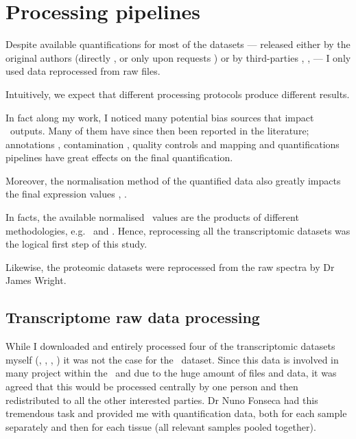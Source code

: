 \section{Processing pipelines}

Despite available quantifications for most of the datasets ---
released either by the original authors (directly \citep{Krupp2012},
\citep{Uhlen2015} or  only upon requests \citep{PandeyData})
or by third-parties \citep{BioGPS1}, \citep{EBIgxa},
\citep{Harmonizome} --- I only used data reprocessed from raw files.

Intuitively, we expect that different processing protocols produce
different results.

In fact along my work, I noticed many potential bias sources that impact
\Rnaseq\ outputs. Many of them have since then been reported in the literature;
annotations \citep{annotationDiff},
contamination \citep{contaminationRNAseq},
quality controls \citep{qualityRNAseq} and
mapping and quantifications pipelines \citep{Fonseca2014}
have great effects on the final quantification.

Moreover, the normalisation method of the quantified data also
greatly impacts the final expression values
\citep{Dillies2013}, \citep{normalisation2}.

In facts, the available normalised \Rnaseq\ values are the products
of different methodologies, e.g.\ \citep{GTExTranscript} and \citep{Krupp2012}.
Hence, reprocessing all the transcriptomic datasets was the logical
first step of this study.

Likewise, the proteomic datasets were reprocessed from the raw spectra by Dr
James Wright.


\subsection{Transcriptome raw data processing}

While I downloaded and entirely processed four of the transcriptomic datasets
myself (,
,
,
)
it was not the case for the \Gtex\ dataset. Since this
data is involved in many project within the \EBI\ and due to the huge amount of
files and data,
it was agreed that this would be processed centrally by one person and then
redistributed to all the other interested parties. Dr Nuno Fonseca had this
tremendous task and provided me with quantification data,
both for each sample separately and then for each tissue (all relevant samples
pooled together).

